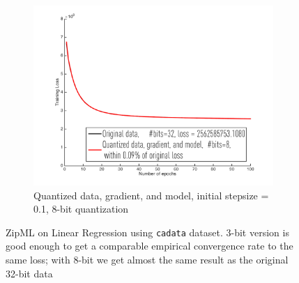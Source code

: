 \documentclass{article}
\begin{document}
\begin{figure}[h]
\begin{subfigure}[h]{.3\columnwidth}
    \includegraphics[width=\columnwidth]{lr/real/cadata/8dgm01}
     \caption{Quantized data, gradient, and model, initial stepsize = 0.1, 8-bit quantization}
    \end{subfigure}
    
\caption{ZipML on Linear Regression using \texttt{cadata} dataset. 3-bit version is good enough to get a comparable empirical convergence rate to the same loss; with 8-bit we get almost the same result as the original 32-bit data}
\label{fig:lrcadata}
\end{figure}
\end{document}
